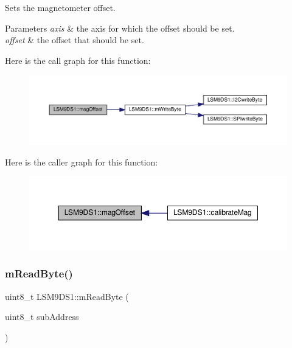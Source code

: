 Sets the magnetometer offset. 


\begin{DoxyParams}{Parameters}
{\em axis} & the axis for which the offset should be set. \\
\hline
{\em offset} & the offset that should be set. \\
\hline
\end{DoxyParams}
Here is the call graph for this function\+:
\nopagebreak
\begin{figure}[H]
\begin{center}
\leavevmode
\includegraphics[width=350pt]{classLSM9DS1_a0d461614bd058b082c94481dc916c18b_cgraph}
\end{center}
\end{figure}
Here is the caller graph for this function\+:
\nopagebreak
\begin{figure}[H]
\begin{center}
\leavevmode
\includegraphics[width=350pt]{classLSM9DS1_a0d461614bd058b082c94481dc916c18b_icgraph}
\end{center}
\end{figure}
\mbox{\label{classLSM9DS1_ae4e470321567e4f93fc09f4cc6cd9efa}} 
\subsubsection{\texorpdfstring{m\+Read\+Byte()}{mReadByte()}}
{\footnotesize\ttfamily uint8\+\_\+t L\+S\+M9\+D\+S1\+::m\+Read\+Byte (\begin{DoxyParamCaption}\item[{uint8\+\_\+t}]{sub\+Address }\end{DoxyParamCaption})\hspace{0.3cm}{\ttfamily [protected]}}



